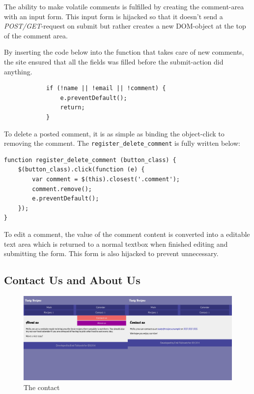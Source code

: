 \documentclass[a4paper]{scrartcl}
\begin{document}
The ability to make volatile comments is fulfilled by creating the comment-area with an input form. This input form is hijacked so that it doesn't send a \textit{POST/GET}-request on submit but rather creates a new DOM-object at the top of the comment area.

By inserting the code below into the function that takes care of new comments, the site ensured that all the fields was filled before the submit-action did anything.

\begin{lstlisting}                                                                         
            if (!name || !email || !comment) {
                e.preventDefault();
                return;                                              
            }
\end{lstlisting}

To delete a posted comment, it is as simple as binding the object-click to removing the comment. The \texttt{register\_delete\_comment} is fully written below:

\begin{lstlisting}
function register_delete_comment (button_class) {
    $(button_class).click(function (e) {
        var comment = $(this).closest('.comment');
        comment.remove();
        e.preventDefault();
    });
}    
\end{lstlisting}

To edit a comment, the value of the comment content is converted into a editable text area which is returned to a normal textbox when finished editing and submitting the form. This form is also hijacked to prevent unnecessary.
                
\subsection{Contact Us and About Us}

\begin{figure}[!h]
  \begin{center}
    \includegraphics[scale=0.3]{contact_all.png}
    \caption{The contact }
    \label{fig:contact}
  \end{center}
\end{figure}
\end{document}
